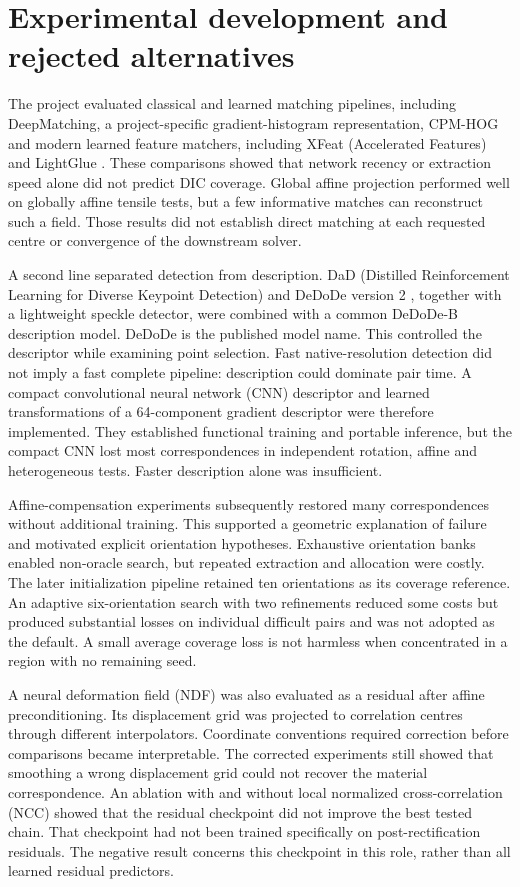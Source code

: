 \section{Experimental development and rejected alternatives}
The project evaluated classical and learned matching pipelines, including DeepMatching, a project-specific gradient-histogram representation, CPM-HOG and modern learned feature matchers, including XFeat (Accelerated Features) \citep{xfeat} and LightGlue \citep{lightglue}. These comparisons showed that network recency or extraction speed alone did not predict DIC coverage. Global affine projection performed well on globally affine tensile tests, but a few informative matches can reconstruct such a field. Those results did not establish direct matching at each requested centre or convergence of the downstream solver.

A second line separated detection from description. DaD (Distilled Reinforcement Learning for Diverse Keypoint Detection) and DeDoDe version 2 \citep{dad,dedode}, together with a lightweight speckle detector, were combined with a common DeDoDe-B description model. DeDoDe is the published model name. This controlled the descriptor while examining point selection. Fast native-resolution detection did not imply a fast complete pipeline: description could dominate pair time. A compact convolutional neural network (CNN) descriptor and learned transformations of a 64-component gradient descriptor were therefore implemented. They established functional training and portable inference, but the compact CNN lost most correspondences in independent rotation, affine and heterogeneous tests. Faster description alone was insufficient.

Affine-compensation experiments subsequently restored many correspondences without additional training. This supported a geometric explanation of failure and motivated explicit orientation hypotheses. Exhaustive orientation banks enabled non-oracle search, but repeated extraction and allocation were costly. The later initialization pipeline retained ten orientations as its coverage reference. An adaptive six-orientation search with two refinements reduced some costs but produced substantial losses on individual difficult pairs and was not adopted as the default. A small average coverage loss is not harmless when concentrated in a region with no remaining seed.

A neural deformation field (NDF) was also evaluated as a residual after affine preconditioning. Its displacement grid was projected to correlation centres through different interpolators. Coordinate conventions required correction before comparisons became interpretable. The corrected experiments still showed that smoothing a wrong displacement grid could not recover the material correspondence. An ablation with and without local normalized cross-correlation (NCC) showed that the residual checkpoint did not improve the best tested chain. That checkpoint had not been trained specifically on post-rectification residuals. The negative result concerns this checkpoint in this role, rather than all learned residual predictors.

